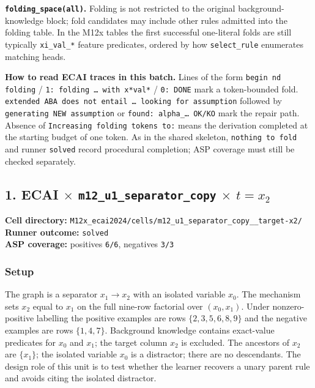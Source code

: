 \documentclass[11pt]{article}
\begin{document}
\textbf{\texttt{folding\_space(all)}.} Folding is not restricted to the original background-knowledge block; fold candidates may include other rules admitted into the folding table. In the M12x tables the first successful one-literal folds are still typically \texttt{xi\_val\_*} feature predicates, ordered by how \texttt{select\_rule} enumerates matching heads.

\textbf{How to read ECAI traces in this batch.} Lines of the form \texttt{begin nd folding} / \texttt{1: folding \ldots{} with x*val*} / \texttt{0: DONE} mark a token-bounded fold. \texttt{extended ABA does not entail \ldots{} looking for assumption} followed by \texttt{generating NEW assumption} or \texttt{found: alpha\_\ldots{} OK/KO} mark the repair path. Absence of \texttt{Increasing folding tokens to:} means the derivation completed at the starting budget of one token. As in the shared skeleton, \texttt{nothing to fold} and runner \texttt{solved} record procedural completion; ASP coverage must still be checked separately.

\subsection{\texorpdfstring{1. ECAI \(\times\) \texttt{m12\_u1\_separator\_copy} \(\times\) \(t=x_2\)}{1. ECAI - m12-u1-separator-copy - target x2}}

\textbf{Cell directory:} \texttt{M12x\_ecai2024/cells/m12\_u1\_separator\_copy\_\_target-x2/}\\
\textbf{Runner outcome:} \texttt{solved}\\
\textbf{ASP coverage:} positives \texttt{6/6}, negatives \texttt{3/3}

\subsubsection{Setup}

The graph is a separator \(x_1\to x_2\) with an isolated variable \(x_0\). The mechanism sets \(x_2\) equal to \(x_1\) on the full nine-row factorial over \((x_0,x_1)\). Under nonzero-positive labelling the positive examples are rows \(\{2,3,5,6,8,9\}\) and the negative examples are rows \(\{1,4,7\}\). Background knowledge contains exact-value predicates for \(x_0\) and \(x_1\); the target column \(x_2\) is excluded. The ancestors of \(x_2\) are \(\{x_1\}\); the isolated variable \(x_0\) is a distractor; there are no descendants. The design role of this unit is to test whether the learner recovers a unary parent rule and avoids citing the isolated distractor.
\end{document}
